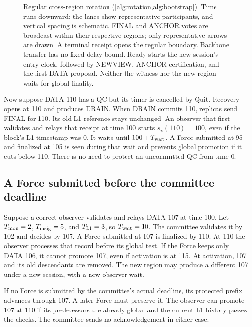 \documentclass[11pt,a4paper]{article}
\newcommand{\Twait}{T_{\rm wait}}
\begin{document}
\begin{figure}[htbp]\centering

\caption{Regular cross-region rotation (\cref{alg:rotation,alg:bootstrap}).
Time runs downward; the lanes show representative participants, and
vertical spacing is schematic. FINAL and ANCHOR votes are broadcast
within their respective regions; only representative arrows are drawn.
A terminal receipt opens the regular boundary. Backbone transfer has no
fixed delay bound. Ready starts the new session's entry clock, followed
by NEWVIEW, ANCHOR certification, and the first DATA proposal. Neither
the witness nor the new region waits for global finality.}
\label{fig:regular-cross-region}
\end{figure}
\FloatBarrier

Now suppose DATA 110 has a QC but its timer is cancelled by Quit.
Recovery opens at 110 and produces DRAIN. When DRAIN commits 110,
replicas send FINAL for 110. Its old L1 reference stays unchanged.
An observer that first validates and relays that receipt at time 100
starts $s_u(110)=100$, even if the block's L1 timestamp was 0. It waits
until $100+\Twait$. A Force submitted at 95 and finalized at 105 is seen
during that wait and prevents global promotion if it cuts below 110.
There is no need to protect an uncommitted QC from time 0.

\subsection{A Force submitted before the committee deadline}
Suppose a correct observer validates and relays DATA 107 at time 100.
Let $T_{\rm mon}=2$, $T_{\rm msig}=5$, and $T_{\rm L1}=3$, so
$\Twait=10$. The committee validates it by 102 and decides by 107.
A Force submitted at 107 is finalized by 110. At 110 the observer
processes that record before its global test. If the Force keeps only
DATA 106, it cannot promote 107, even if activation is at 115. At
activation, 107 and its old descendants are removed. The new region may
produce a different 107 under a new session, with a new observer
wait.

If no Force is submitted by the committee's actual deadline, its
protected prefix advances through 107. A later Force must preserve it.
The observer can promote 107 at 110 if its predecessors are already
global and the current L1 history passes the checks. The committee sends
no acknowledgement in either case.
\end{document}
